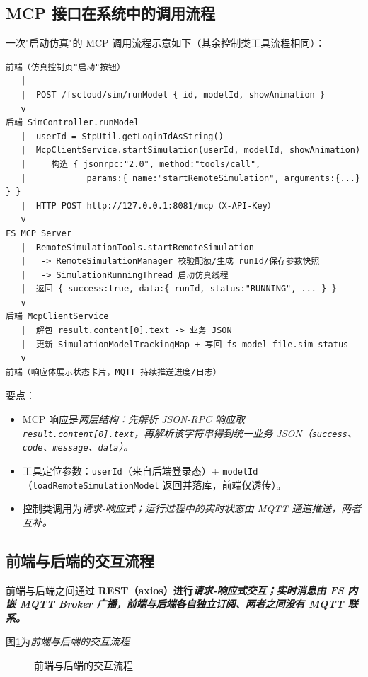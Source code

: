 \subsection{MCP 接口在系统中的调用流程}
一次"启动仿真"的 MCP 调用流程示意如下（其余控制类工具流程相同）：
\begin{verbatim}
前端（仿真控制页"启动"按钮）
   |
   |  POST /fscloud/sim/runModel { id, modelId, showAnimation }
   v
后端 SimController.runModel
   |  userId = StpUtil.getLoginIdAsString()
   |  McpClientService.startSimulation(userId, modelId, showAnimation)
   |     构造 { jsonrpc:"2.0", method:"tools/call",
   |            params:{ name:"startRemoteSimulation", arguments:{...} } }
   |  HTTP POST http://127.0.0.1:8081/mcp（X-API-Key）
   v
FS MCP Server
   |  RemoteSimulationTools.startRemoteSimulation
   |   -> RemoteSimulationManager 校验配额/生成 runId/保存参数快照
   |   -> SimulationRunningThread 启动仿真线程
   |  返回 { success:true, data:{ runId, status:"RUNNING", ... } }
   v
后端 McpClientService
   |  解包 result.content[0].text -> 业务 JSON
   |  更新 SimulationModelTrackingMap + 写回 fs_model_file.sim_status
   v
前端（响应体展示状态卡片，MQTT 持续推送进度/日志）
\end{verbatim}
\vspace{-30pt}
要点：
\begin{itemize}
	\item MCP 响应是\it{两层结构}：先解析 JSON-RPC 响应取 \texttt{result.content[0].text}，再解析该字符串得到统一业务 JSON（\texttt{success}、\texttt{code}、\texttt{message}、\texttt{data}）。
	\item 工具定位参数：\texttt{userId}（来自后端登录态）+ \texttt{modelId}（\texttt{loadRemoteSimulationModel} 返回并落库，前端仅透传）。
	\item 控制类调用为\it{请求-响应}式；运行过程中的实时状态由 MQTT 通道推送，两者互补。
\end{itemize}

\subsection{前端与后端的交互流程}
前端与后端之间通过 \bf{REST（axios）}进行\it{请求-响应}式交互；实时消息由 FS 内嵌 MQTT Broker 广播，\bf{前端与后端各自独立订阅、两者之间没有 MQTT 联系}。

图\ref{fig:flowcharFEnBE}为\it{前端与后端的交互流程}

\begin{figure}[!h]
	\centering
	\resizebox{1.0\linewidth}{!}{}
	\caption{前端与后端的交互流程}\label{fig:flowcharFEnBE}
\end{figure}

